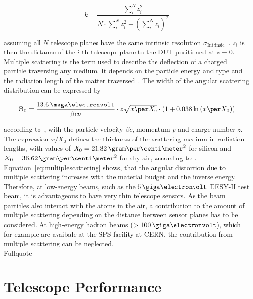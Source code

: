 \begin{equation}
k = \frac{\sum_i^N z_i^2}{N \cdot \sum_i^N z_i^2 - \left( \sum_i^N z_i
\right)^2}
\end{equation}

assuming all $N$ telescope planes have the same intrinsic resolution
$\sigma_{\textrm{Intrinsic}}$~\cite{ref:eudetreport200902}. $z_i$ is then the
distance of the $i$-th telescope plane to the DUT positioned at $z=0$.\\

Multiple scattering is the term used to describe the deflection of a charged
particle traversing any medium. It depends on the particle energy and type
and the radiation length of the matter traversed~\cite{ref:scatteringhighland}.
The width of the angular scattering distribution can be expressed by

\begin{equation}
\label{eq:multiplescattering}
\Theta_{0} = \frac{13.6\,\mega\electronvolt}{\beta c p} \cdot z
\sqrt{x \per X_0}
\cdot \left( 1 + 0.038 \ln{\left( x \per X_0\right) } \right)
\end{equation}

according to~\cite{ref:PDG-2014}, with the particle velocity $\beta c$, momentum
$p$ and charge number $z$. The expression $x/X_0$ defines the thickness of the
scattering medium in radiation lengths, with values of $X_0 =
21.82\,\allowbreak\gram\per\centi\meter^2$ for silicon and $X_0 =
36.62\,\gram\per\centi\meter^2$ for dry air, according to~\cite{ref:x0values}.\\

Equation~\ref{eq:multiplescattering} shows, that the angular distortion due to
multiple scattering increases with the material budget and the inverse energy.
Therefore, at low-energy beams, such as the $6\,\giga\electronvolt$ DESY-II test
beam, it is advantageous to have very thin telescope sensors. As the beam
particles also interact with the atoms in the air, a contribution to the amount
of multiple scattering depending on the distance between sensor planes has to be
considered. At high-energy hadron beams ($> 100\,\giga\electronvolt$), which for
example are avaibale at the SPS facility at CERN, the contribution from multiple
scattering can be neglected.\\





Fullquote~\cite{ref:thomas}
\bigskip


\section{Telescope Performance}\label{sec:telescoperesolution}

